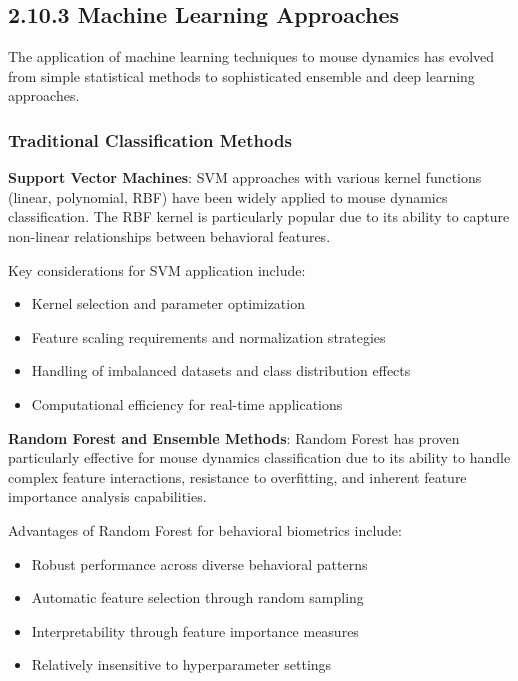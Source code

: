 \documentclass[
  12pt,
  a4paper,
]{report}
\providecommand{\tightlist}{%
  \setlength{\itemsep}{0pt}\setlength{\parskip}{0pt}}
\begin{document}
\subsection{2.10.3 Machine Learning
Approaches}\label{machine-learning-approaches-1}

The application of machine learning techniques to mouse dynamics has
evolved from simple statistical methods to sophisticated ensemble and
deep learning approaches.

\subsubsection{Traditional Classification
Methods}\label{traditional-classification-methods}

\textbf{Support Vector Machines}: SVM approaches with various kernel
functions (linear, polynomial, RBF) have been widely applied to mouse
dynamics classification. The RBF kernel is particularly popular due to
its ability to capture non-linear relationships between behavioral
features.

Key considerations for SVM application include:

\begin{itemize}
\tightlist
\item
  Kernel selection and parameter optimization
\item
  Feature scaling requirements and normalization strategies
\item
  Handling of imbalanced datasets and class distribution effects
\item
  Computational efficiency for real-time applications
\end{itemize}

\textbf{Random Forest and Ensemble Methods}: Random Forest has proven
particularly effective for mouse dynamics classification due to its
ability to handle complex feature interactions, resistance to
overfitting, and inherent feature importance analysis capabilities.

Advantages of Random Forest for behavioral biometrics include:

\begin{itemize}
\tightlist
\item
  Robust performance across diverse behavioral patterns
\item
  Automatic feature selection through random sampling
\item
  Interpretability through feature importance measures
\item
  Relatively insensitive to hyperparameter settings
\end{itemize}
\end{document}
